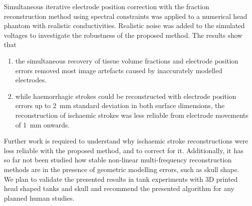 Simultaneous iterative electrode position correction with the fraction reconstruction method using spectral constraints was applied to a numerical head phantom with realistic conductivities. Realistic noise was added to the simulated voltages to investigate the robustness of the proposed method. The results show that

\begin{enumerate}
\item the simultaneous recovery of tissue volume fractions and electrode position errors removed most image artefacts caused by inaccurately modelled electrodes.
\item while haemorrhagic strokes could be reconstructed with electrode position errors up to \SI{2}{\milli\metre} standard deviation in both surface dimensions, the reconstruction of ischaemic strokes was less reliable from electrode movements of \SI{1}{\milli\metre} onwards.
\end{enumerate}

Further work is required to understand why ischaemic stroke reconstructions were less reliable with the proposed method, and to correct for it. Additionally, it has so far not been studied how stable non-linear multi-frequency reconstruction methods are in the presence of geometric modelling errors, such as skull shape. We plan to validate the presented results in tank experiments with 3D printed head shaped tanks and skull \citep{Jehl2015b} and recommend the presented algorithm for any planned human studies.